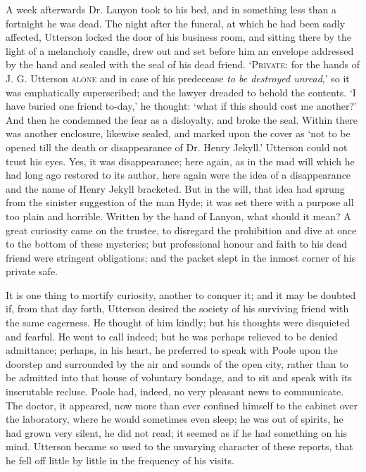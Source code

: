 \documentclass[]{novel}
\begin{document}
A week afterwards Dr. Lanyon took to his bed, and in something less than a fortnight he was dead. The night after the funeral, at which he had been sadly affected, Utterson locked the door of his business room, and sitting there by the light of a melancholy candle, drew out and set before him an envelope addressed by the hand and sealed with the seal of his dead friend. ‘\textsc{Private:} for the hands of J. G. Utterson \textsc{alone} and in case of his predecease \emph{to be destroyed unread},’ so it was emphatically superscribed; and the lawyer dreaded to behold the contents. ‘I have buried one friend to-day,’ he thought: ‘what if this should cost me another?’ And then he condemned the fear as a disloyalty, and broke the seal. Within there was another enclosure, likewise sealed, and marked upon the cover as ‘not to be opened till the death or disappearance of Dr. Henry Jekyll.’ Utterson could not trust his eyes. Yes, it was disappearance; here again, as in the mad will which he had long ago restored to its author, here again were the idea of a disappearance and the name of Henry Jekyll bracketed. But in the will, that idea had sprung from the sinister suggestion of the man Hyde; it was set there with a purpose all too plain and horrible. Written by the hand of Lanyon, what should it mean? A great curiosity came on the trustee, to disregard the prohibition and dive at once to the bottom of these mysteries; but professional honour and faith to his dead friend were stringent obligations; and the packet slept in the inmost corner of his private safe.

It is one thing to mortify curiosity, another to conquer it; and it may be doubted if, from that day forth, Utterson desired the society of his surviving friend with the same eagerness. He thought of him kindly; but his thoughts were disquieted and fearful. He went to call indeed; but he was perhaps relieved to be denied admittance; perhaps, in his heart, he preferred to speak with Poole upon the doorstep and surrounded by the air and sounds of the open city, rather than to be admitted into that house of voluntary bondage, and to sit and speak with its inscrutable recluse. Poole had, indeed, no very pleasant news to communicate. The doctor, it appeared, now more than ever confined himself to the cabinet over the laboratory, where he would sometimes even sleep; he was out of spirits, he had grown very silent, he did not read; it seemed as if he had something on his mind. Utterson became so used to the unvarying character of these reports, that he fell off little by little in the frequency of his visits.
\clearpage
\label{ch:07}
\begin{ChapterStart}
\vspace*{4\nbs}
\null\vspace{0.75\nbs}
\end{ChapterStart}
\end{document}
